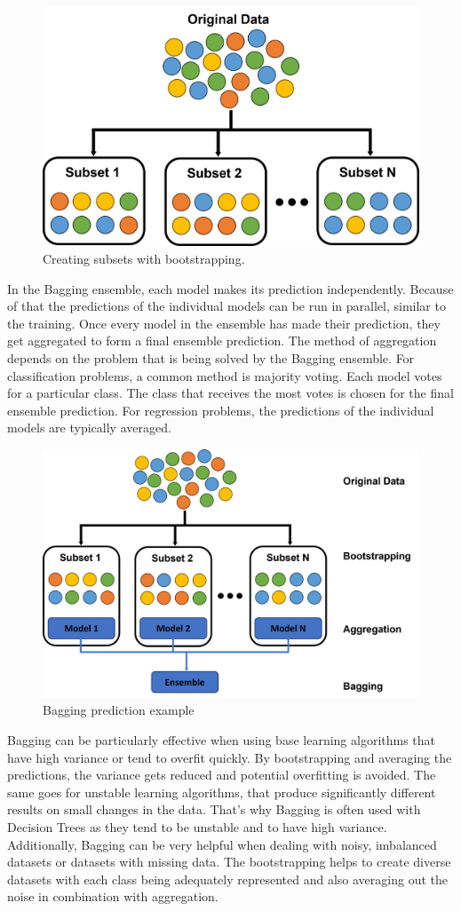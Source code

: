 \begin{figure}[htbp]
    \label{fig:bootstrapping}
    \centering
    \includegraphics[width=.6\textwidth]{figures/bootstrapping}
    \caption{Creating subsets with bootstrapping.}
\end{figure}

In the Bagging ensemble, each model makes its prediction independently. Because of
that the predictions of the individual models can be run in parallel, similar to
the training. Once every model in the ensemble has made their prediction, they get
aggregated to form a final ensemble prediction. The method of aggregation depends
on the problem that is being solved by the Bagging ensemble. 
For classification problems, a common method is majority voting. Each model votes 
for a particular class. The class that receives the most votes is chosen for the
final ensemble prediction.
For regression problems, the predictions of the individual models are typically 
averaged.

\begin{figure}[htbp]
    \centering
    \includegraphics[width=.65\textwidth]{figures/bagging_prediction}
    \caption{Bagging prediction example}
\end{figure}

\newpage
Bagging can be particularly effective when using base learning algorithms
that have high variance or tend to overfit quickly. By bootstrapping and 
averaging the predictions, the variance gets reduced and potential overfitting
is avoided.
The same goes for unstable learning algorithms, that produce significantly different
results on small changes in the data. That's why Bagging is often used with Decision
Trees as they tend to be unstable and to have high variance.
Additionally, Bagging can be very helpful when dealing with noisy, imbalanced 
datasets or datasets with missing data. The bootstrapping helps to create 
diverse datasets with each class being adequately represented and also averaging
out the noise in combination with aggregation.


